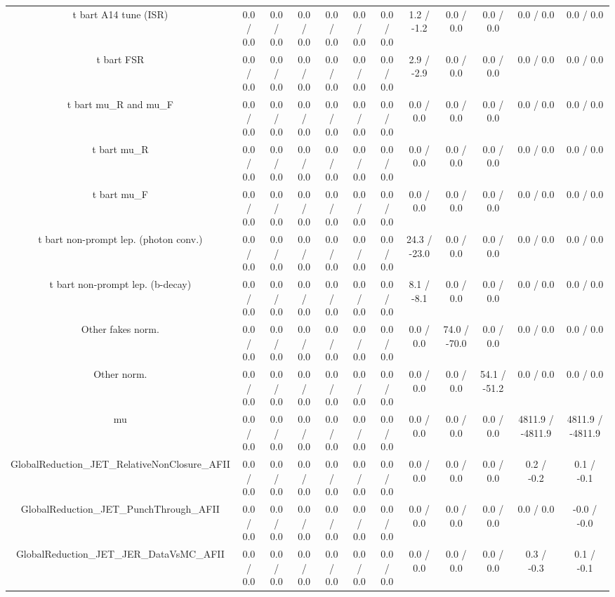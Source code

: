 \begin{table}[htbp]
\begin{center}
\begin{tabular}{|c|c|c|c|c|c|c|c|c|c|c|c|}
  t bar{t} A14 tune (ISR) & 0.0 / 0.0 & 0.0 / 0.0 & 0.0 / 0.0 & 0.0 / 0.0 & 0.0 / 0.0 & 0.0 / 0.0 & 1.2 / -1.2 & 0.0 / 0.0 & 0.0 / 0.0 & 0.0 / 0.0 & 0.0 / 0.0 \\ 
  t bar{t} FSR & 0.0 / 0.0 & 0.0 / 0.0 & 0.0 / 0.0 & 0.0 / 0.0 & 0.0 / 0.0 & 0.0 / 0.0 & 2.9 / -2.9 & 0.0 / 0.0 & 0.0 / 0.0 & 0.0 / 0.0 & 0.0 / 0.0 \\ 
  t bar{t}  mu_{R} and  mu_{F} & 0.0 / 0.0 & 0.0 / 0.0 & 0.0 / 0.0 & 0.0 / 0.0 & 0.0 / 0.0 & 0.0 / 0.0 & 0.0 / 0.0 & 0.0 / 0.0 & 0.0 / 0.0 & 0.0 / 0.0 & 0.0 / 0.0 \\ 
  t bar{t}  mu_{R} & 0.0 / 0.0 & 0.0 / 0.0 & 0.0 / 0.0 & 0.0 / 0.0 & 0.0 / 0.0 & 0.0 / 0.0 & 0.0 / 0.0 & 0.0 / 0.0 & 0.0 / 0.0 & 0.0 / 0.0 & 0.0 / 0.0 \\ 
  t bar{t}  mu_{F} & 0.0 / 0.0 & 0.0 / 0.0 & 0.0 / 0.0 & 0.0 / 0.0 & 0.0 / 0.0 & 0.0 / 0.0 & 0.0 / 0.0 & 0.0 / 0.0 & 0.0 / 0.0 & 0.0 / 0.0 & 0.0 / 0.0 \\ 
  t bar{t} non-prompt lep. (photon conv.) & 0.0 / 0.0 & 0.0 / 0.0 & 0.0 / 0.0 & 0.0 / 0.0 & 0.0 / 0.0 & 0.0 / 0.0 & 24.3 / -23.0 & 0.0 / 0.0 & 0.0 / 0.0 & 0.0 / 0.0 & 0.0 / 0.0 \\ 
  t bar{t} non-prompt lep. (b-decay) & 0.0 / 0.0 & 0.0 / 0.0 & 0.0 / 0.0 & 0.0 / 0.0 & 0.0 / 0.0 & 0.0 / 0.0 & 8.1 / -8.1 & 0.0 / 0.0 & 0.0 / 0.0 & 0.0 / 0.0 & 0.0 / 0.0 \\ 
  Other fakes norm. & 0.0 / 0.0 & 0.0 / 0.0 & 0.0 / 0.0 & 0.0 / 0.0 & 0.0 / 0.0 & 0.0 / 0.0 & 0.0 / 0.0 & 74.0 / -70.0 & 0.0 / 0.0 & 0.0 / 0.0 & 0.0 / 0.0 \\ 
  Other norm. & 0.0 / 0.0 & 0.0 / 0.0 & 0.0 / 0.0 & 0.0 / 0.0 & 0.0 / 0.0 & 0.0 / 0.0 & 0.0 / 0.0 & 0.0 / 0.0 & 54.1 / -51.2 & 0.0 / 0.0 & 0.0 / 0.0 \\ 
  mu & 0.0 / 0.0 & 0.0 / 0.0 & 0.0 / 0.0 & 0.0 / 0.0 & 0.0 / 0.0 & 0.0 / 0.0 & 0.0 / 0.0 & 0.0 / 0.0 & 0.0 / 0.0 & 4811.9 / -4811.9 & 4811.9 / -4811.9 \\ 
  GlobalReduction_JET_RelativeNonClosure_AFII & 0.0 / 0.0 & 0.0 / 0.0 & 0.0 / 0.0 & 0.0 / 0.0 & 0.0 / 0.0 & 0.0 / 0.0 & 0.0 / 0.0 & 0.0 / 0.0 & 0.0 / 0.0 & 0.2 / -0.2 & 0.1 / -0.1 \\ 
  GlobalReduction_JET_PunchThrough_AFII & 0.0 / 0.0 & 0.0 / 0.0 & 0.0 / 0.0 & 0.0 / 0.0 & 0.0 / 0.0 & 0.0 / 0.0 & 0.0 / 0.0 & 0.0 / 0.0 & 0.0 / 0.0 & 0.0 / 0.0 & -0.0 / -0.0 \\ 
  GlobalReduction_JET_JER_DataVsMC_AFII & 0.0 / 0.0 & 0.0 / 0.0 & 0.0 / 0.0 & 0.0 / 0.0 & 0.0 / 0.0 & 0.0 / 0.0 & 0.0 / 0.0 & 0.0 / 0.0 & 0.0 / 0.0 & 0.3 / -0.3 & 0.1 / -0.1 \\ 

\end{tabular}
\end{center}
\end{table}
